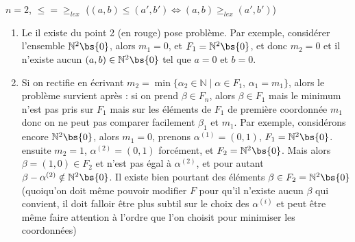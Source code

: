 \documentclass[11pt]{article}
\begin{document}
\begin{remq}
    $n = 2$, $\leq = \geq_{lex}$ ($(a,b) \leq (a',b') \iff (a,b) \geq_{lex} (a',b')$)
    \begin{enumerate}
        \item Le il existe du point 2 (en rouge) pose problème. Par exemple, considérer l'ensemble $\mathbb{N}^2 \bs \{0\}$, alors $m_1 = 0$, et $F_1 = \mathbb{N}^2 \bs \{0\}$, et donc $m_2 = 0$ et il n'existe aucun $(a,b) \in \mathbb{N}^2 \bs \{0\}$ tel que $a = 0$ et $b = 0$.
        \item Si on rectifie en écrivant $m_2 = \min \{\alpha_2 \in \mathbb{N} \mid \alpha \in F_1,\, \alpha_1 = m_1\}$, alors le problème survient après : si on prend $\beta \in F_n$, alors $\beta \in F_1$ mais le minimum n'est pas pris sur $F_1$ mais sur les éléments de $F_1$ de première coordonnée $m_1$ donc on ne peut pas comparer facilement $\beta_1$ et $m_1$. Par exemple, considérons encore $\mathbb{N}^2 \bs \{0\}$, alors $m_1 = 0$, prenons $\alpha^{(1)} = (0,1)$, $F_1 = \mathbb{N}^2 \bs \{0\}$. ensuite $m_2 = 1$, $\alpha^{(2)} = (0,1)$ forcément, et $F_2 = \mathbb{N}^2 \bs \{0\}$. Mais alors $\beta  = (1,0) \in F_2$ et n'est pas égal à $\alpha^{(2)}$, et pour autant $\beta - \alpha^{(2)} \notin \mathbb{N}^2 \bs \{0\}$. Il existe bien pourtant des éléments $\beta \in F_2 = \mathbb{N}^2 \bs \{0\}$ (quoiqu'on doit même pouvoir modifier $F$ pour qu'il n'existe aucun $\beta$ qui convient, il doit falloir être plus subtil sur le choix des $\alpha^{(i)}$ et peut être même faire attention à l'ordre que l'on choisit pour minimiser les coordonnées)
    \end{enumerate}
\end{remq}
\end{document}
